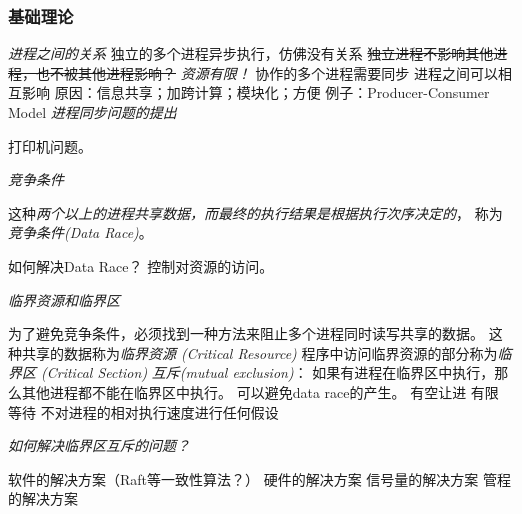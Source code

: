 \documentclass{ctexart}
\begin{document}
\subsubsection{基础理论}
\begin{outline}
    \1 \emph{进程之间的关系}
        \2 独立的多个进程异步执行，仿佛没有关系
            \3 \sout{独立进程不影响其他进程，也不被其他进程影响？}
            \3 \emph{资源有限！}
        \2 协作的多个进程需要同步
            \3 进程之间可以相互影响
            \3 原因：信息共享；加跨计算；模块化；方便
            \3 例子：Producer-Consumer Model
    \1 \emph{进程同步问题的提出}

    打印机问题。
    
    \1 \emph{竞争条件}

    这种\emph{两个以上的进程共享数据，而最终的执行结果是根据执行次序决定的}，
    称为\emph{竞争条件(Data Race)}。

    如何解决Data Race？ 控制对资源的访问。

    \1 \emph{临界资源和临界区}

    为了避免竞争条件，必须找到一种方法来阻止多个进程同时读写共享的数据。
        \2 这种共享的数据称为\emph{临界资源 (Critical Resource)}
        \2 程序中访问临界资源的部分称为\emph{临界区 (Critical Section)} 
        \2 \emph{互斥(mutual exclusion)}：
            \3 如果有进程在临界区中执行，那么其他进程都不能在临界区中执行。
            \3 可以避免data race的产生。
        \2 有空让进
        \2 有限等待
        \2 不对进程的相对执行速度进行任何假设

    \1 \emph{如何解决临界区互斥的问题？}
    
        \2 软件的解决方案（Raft等一致性算法？）
        \2 硬件的解决方案
        \2 信号量的解决方案
        \2 管程的解决方案
\end{outline}
\end{document}
